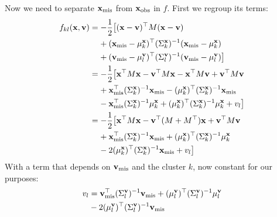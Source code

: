 \documentclass[letterpaper]{article}
\newcommand{\tp}{\top}
\newcommand{\vx}{{\bf x}}
\newcommand{\vv}{{\bf v}}
\newcommand{\mis}{\text{mis}}
\newcommand{\obs}{\text{obs}}
\begin{document}
Now we need to separate $\vx_\mis$ from $\vx_\obs$ in $f$. First we regroup its terms:
\begin{equation*}
\begin{aligned}
f_{kl}(\vx, \vv) &= - \frac{1}{2}\big[(\vx-\vv)^\tp M (\vx-\vv) \\
&\hspace{1.1em}+ (\vx_\text{mis} - \mu_k^\vx)^\tp (\Sigma_k^\vx)^{-1}(\vx_\text{mis} - \mu_k^\vx ) \\
&\hspace{1.1em}+ (\vv_\text{mis} - \mu_l^\vv)^\tp (\Sigma_l^\vv)^{-1}(\vv_\text{mis} - \mu_l^\vv) \big] \\
&= -\frac{1}{2}\big[\vx^\tp M \vx - \vv^\tp M \vx - \vx^\tp M \vv + \vv^\tp M \vv \\
&\hspace{1.1em}+ \vx_\text{mis}^\tp  (\Sigma_k^\vx)^{-1}\vx_\text{mis} - (\mu_k^\vx)^\tp (\Sigma_k^\vx)^{-1} \vx_\text{mis} \\
&\hspace{1.1em}- \vx_\text{mis}^\tp (\Sigma_k^\vx)^{-1} \mu_k^\vx + (\mu_k^\vx)^\tp (\Sigma_k^\vx)^{-1} \mu_k^\vx + v_l \big] \\
&= -\frac{1}{2}\big[\vx^\tp M \vx - \vv^\tp (M+M^\tp) \vx + \vv^\tp M \vv \\
&\hspace{1.1em}+ \vx_\text{mis}^\tp  (\Sigma_k^\vx)^{-1}\vx_\text{mis} + (\mu_k^\vx)^\tp (\Sigma_k^\vx)^{-1} \mu_k^\vx \\
&\hspace{1.1em}- 2 (\mu_k^\vx)^\tp (\Sigma_k^\vx)^{-1} \vx_\text{mis}  + v_l \big] \\
\end{aligned}
\end{equation*}
With a term that depends on $\vv_\mis$ and the cluster $k$, now constant for our purposes:
\begin{equation*}
\begin{aligned}
v_l &= \vv_\text{mis}^\tp  (\Sigma_l^\vv)^{-1}\vv_\text{mis} + (\mu_l^\vv)^\tp (\Sigma_l^\vv)^{-1} \mu_l^\vv \\
&- 2 (\mu_l^\vv)^\tp (\Sigma_l^\vv)^{-1}\vv_\text{mis} \\
\end{aligned}
\end{equation*}
\end{document}
